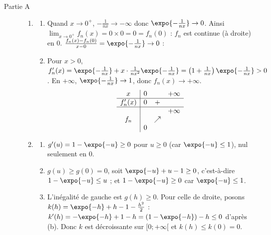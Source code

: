 \begin{description}
	\item[Partie A]
	\begin{enumerate}
		\item
		\begin{enumerate}
			\item {}
				Quand $x \to 0^+$, $-\frac{1}{nx} \to -\infty$ donc $\expo{-\frac{1}{nx}} \to 0$.
				Ainsi $\lim_{x\to 0^+} f_n(x) = 0 \times 0 = 0 = f_n(0)$ : $f_n$ est continue (à droite) en $0$.
				$\frac{f_n(x) - f_n(0)}{x - 0} = \expo{-\frac{1}{nx}} \to 0$ :
				\par\noindent{}
			\item {}
				Pour $x > 0$, $f_n'(x) = \expo{-\frac{1}{nx}} + x \cdot \frac{1}{nx^2}\expo{-\frac{1}{nx}} = \left(1 + \frac{1}{nx}\right)\expo{-\frac{1}{nx}} > 0$.
				En $+\infty$, $\expo{-\frac{1}{nx}} \to 1$, donc $f_n(x) \to +\infty$.
				\[
				\begin{array}{c|ccc}
					x & 0 & & +\infty \\ \hline
					f_n'(x) & 0 & + & \\ \hline
					 & & & +\infty \\
					f_n & & \nearrow & \\
					 & 0 & &
				\end{array}
				\]
		\end{enumerate}
		\item
		\begin{enumerate}
			\item {}
				$g'(u) = 1 - \expo{-u} \geq 0$ pour $u \geq 0$ (car $\expo{-u} \leq 1$), nul seulement en $0$.
				\par\noindent\ansbox{$g$ est strictement croissante sur $[0;+\infty[$.}
			\item {}
				$g(u) \geq g(0) = 0$, soit $\expo{-u} + u - 1 \geq 0$, c'est-à-dire $1 - \expo{-u} \leq u$ ; et $1 - \expo{-u} \geq 0$ car $\expo{-u} \leq 1$.
				\par\noindent{}
			\item {}
				L'inégalité de gauche est $g(h) \geq 0$. Pour celle de droite, posons $k(h) = \expo{-h} + h - 1 - \frac{h^2}{2}$ :
				$k'(h) = -\expo{-h} + 1 - h = (1 - \expo{-h}) - h \leq 0$ d'après (b). Donc $k$ est décroissante sur $[0;+\infty[$ et $k(h) \leq k(0) = 0$.

\end{enumerate}
\end{enumerate}
\end{description}
